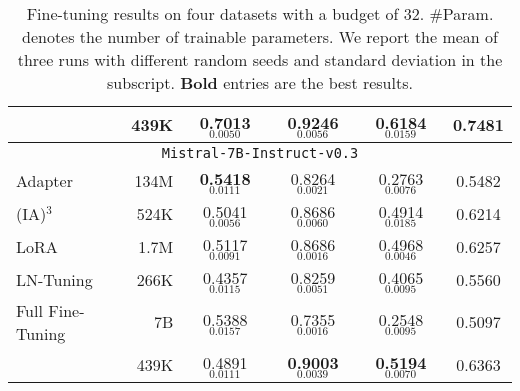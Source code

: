 \begin{table*}
\begin{tabular}[t]{l|r|ccc|c}
\midrule
\method{} & 439K & \textbf{0.7013}$_{0.0050}$ & \textbf{0.9246}$_{0.0056}$ & \textbf{0.6184}$_{0.0159}$ & 0.7481 \\
\toprule
\multicolumn{6}{c}{\texttt{Mistral-7B-Instruct-v0.3}} \\
\midrule
Adapter~\cite{DBLP:conf/icml/HoulsbyGJMLGAG19} & 134M & \textbf{0.5418}$_{0.0111}$ & 0.8264$_{0.0021}$ & 0.2763$_{0.0076}$ & 0.5482 \\
(IA)$^3$~\cite{DBLP:conf/nips/LiuTMMHBR22} & 524K & 0.5041$_{0.0056}$ & 0.8686$_{0.0060}$ & 0.4914$_{0.0185}$ & 0.6214 \\
LoRA~\cite{DBLP:conf/iclr/HuSWALWWC22} & 1.7M & 0.5117$_{0.0091}$ & 0.8686$_{0.0016}$ & 0.4968$_{0.0046}$ & 0.6257 \\
LN-Tuning~\cite{DBLP:conf/iclr/ZhaoT0MX24} & 266K & 0.4357$_{0.0115}$ & 0.8259$_{0.0051}$ & 0.4065$_{0.0095}$ & 0.5560 \\
Full Fine-Tuning & 7B & 0.5388$_{0.0157}$ & 0.7355$_{0.0016}$ & 0.2548$_{0.0095}$ & 0.5097 \\
\midrule
\method{} & 439K & 0.4891$_{0.0111}$ & \textbf{0.9003}$_{0.0039}$ & \textbf{0.5194}$_{0.0070}$ & 0.6363 \\
\bottomrule
\end{tabular}
\caption{Fine-tuning results on four datasets with a budget of 32. \#Param. denotes the number of trainable parameters. We report the mean of three runs with different random seeds and standard deviation in the subscript. \textbf{Bold} entries are the best results.}
\label{tab:meta}
\end{table*}
